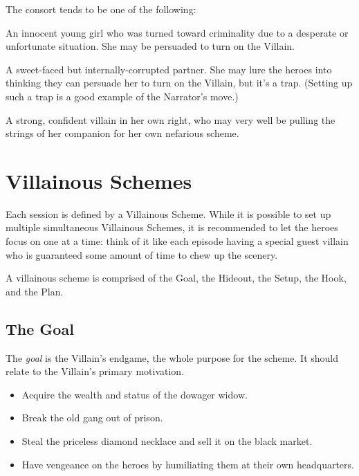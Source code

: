 \documentclass[letterpaper]{report}
\begin{document}
The consort tends to be one of the following:
\begin{choices}
\item An innocent young girl who was turned toward criminality due
  to a desperate or unfortunate situation. She may be persuaded
  to turn on the Villain.
\item A sweet-faced but internally-corrupted partner. She may
  lure the heroes into thinking they can persuade her to turn
  on the Villain, but it's a trap. (Setting up such a trap
  is a good example of the Narrator's  move.)
\item A strong, confident villain in her own right, who may very
  well be pulling the strings of her companion for her own
  nefarious scheme.
\end{choices}

\section{Villainous Schemes}
\label{sec:schemes}

Each session is defined by a Villainous Scheme. While it is possible
to set up multiple simultaneous Villainous Schemes, it is recommended
to let the heroes focus on one at a time: think of it like
each episode having a special guest villain who is guaranteed some
amount of time to chew up the scenery.

A villainous scheme is comprised of the Goal, the Hideout, the Setup,
the Hook, and the Plan.

\subsection*{The Goal}
The \emph{goal} is the Villain's endgame, the whole purpose for the scheme.
It should relate to the Villain's primary motivation.

\begin{example*}
  \begin{itemize}
  \item Acquire the wealth and status of the dowager widow.
  \item Break the old gang out of prison.
  \item Steal the priceless diamond necklace and sell it on the black market.
  \item Have vengeance on the heroes by humiliating them
    at their own headquarters.
  \end{itemize}
\end{example*}
\end{document}
